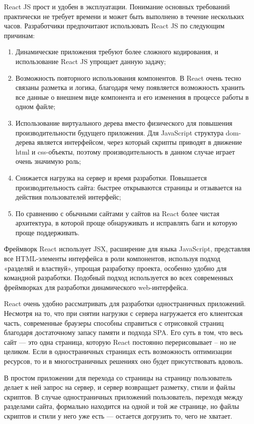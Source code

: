 \documentclass[master, och, pract]{SCWorks}
\begin{document}
React JS прост и удобен в эксплуатации. Понимание основных требований практически не требует времени и может быть выполнено в течение нескольких часов. Разработчики предпочитают использовать React JS по следующим причинам:
\begin{enumerate}
    \item Динамические приложения требуют более сложного кодирования, и использование React JS упрощает данную задачу;
    \item Возможность повторного использования компонентов. В React очень тесно связаны разметка и логика, благодаря чему появляется возможность хранить все данные о внешнем виде компонента и его изменения в процессе работы в одном файле;
    \item Использование виртуального дерева вместо физического для повышения производительности будущего приложения. Для JavaScript структура dom-дерева является интерфейсом, через который скрипты приводят в движение html и css-объекты, поэтому производительность в данном случае играет очень значимую роль;
    \item Снижается нагрузка на сервер и время разработки. Повышается производительность сайта: быстрее открываются страницы и отзывается на действия пользователей интерфейс;
    \item По сравнению с обычными сайтами у сайтов на React более чистая архитектура, в которой проще обнаруживать и исправлять баги и которую проще поддерживать. \cite{rjs_vs_rn}\cite{rjs}
\end{enumerate}

Фреймворк React использует JSX, расширение для языка JavaScript, представляя все HTML-элементы интерфейса в роли компонентов, используя подход «разделяй и властвуй», упрощая разработку проекта, особенно удобно для командной разработки. Подобный подход используется во всех современных фреймворках для разработки динамического web-интерфейса\cite{Ershov_web}.

React очень удобно рассматривать для разработки одностраничных приложений. Несмотря на то, что при снятии нагрузки с сервера нагружается его клиентская часть, современные браузеры способны справиться с отрисовкой страниц благодаря достаточному запасу памяти и подхода SPA. Его суть в том, что весь сайт — это одна страница, которую React постоянно перерисовывает – но не целиком. Если в одностраничных страницах есть возможность оптимизации ресурсов, то и в многостраничных решениях оно будет присутствовать вдоволь.

В простом приложении для перехода со страницы на страницу пользователь делает к ней запрос на сервер, и сервер возвращает разметку, стили и файлы скриптов. В случае одностраничных приложений пользователь, переходя между разделами сайта, формально находится на одной и той же странице, но файлы скриптов и стили у него уже есть — остается догрузить то, чего не хватает. 
\end{document}
